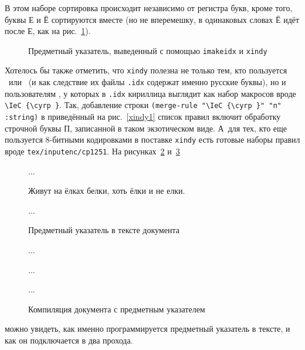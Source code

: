 \documentclass[a4paper,12pt,hyphens]{article}
\newcommand\package[1]{\texttt{#1}}
\newcommand\exe[1]{\texttt{#1}}
\newcommand\file[1]{\texttt{#1}}
\begin{document}
В этом наборе сортировка происходит независимо от регистра букв, кроме того, буквы
Е и Ё сортируются вместе (но не вперемешку, в одинаковых словах Ё идёт после Е,
как на рис.~\ref{xindy4}).
\begin{figure}[tp]
\begin{tcolorbox}[colback=white,colframe=white]
\small
\vspace*{-2ex}
\printindex
\end{tcolorbox}
\caption{Предметный указатель, выведенный с помощью \package{imakeidx} и
\exe{xindy}}\label{xindy4}
\end{figure}
Хотелось бы также отметить, что \exe{xindy} полезна не только тем, кто пользуется
\LuaLaTeX\ или \XeTeX\ (и как следствие их файлы \file{.idx} содержат именно русские буквы),
но и пользователям \pdfLaTeX, у которых в \file{.idx} кириллица выглядит как набор макросов
вроде \verb|\IeC {\cyrp }|. Так, добавление строки
\verb|(merge-rule "\IeC {\cyrp }" "п" :string)| в приведённый на рис.~\ref{xindy1} список правил
включит обработку строчной буквы П, записанной в таком экзотическом виде. А~для тех, кто
еще пользуется 8-битными кодировками в поставке \exe{xindy} есть готовые наборы правил
вроде \file{tex/inputenc/cp1251}.
На рисунках~\ref{xindy2} и~\ref{xindy3}%
\begin{figure}[tp]
\begin{latexcode}
\usepackage[xindy,noautomatic]{imakeidx}
\makeindex

...

Живут на ёлках белки, хоть ёлки и не елки.

...

\printindex
\end{latexcode}
\caption{Предметный указатель в тексте документа}\label{xindy2}
\end{figure}%
\begin{figure}[tp]
\begin{shcode}

...


...


...

%
\end{shcode}
\caption{Компиляция документа с предметным указателем}\label{xindy3}
\end{figure}
можно увидеть, как именно программируется
предметный указатель в тексте, и как он подключается в два прохода.
\end{document}
